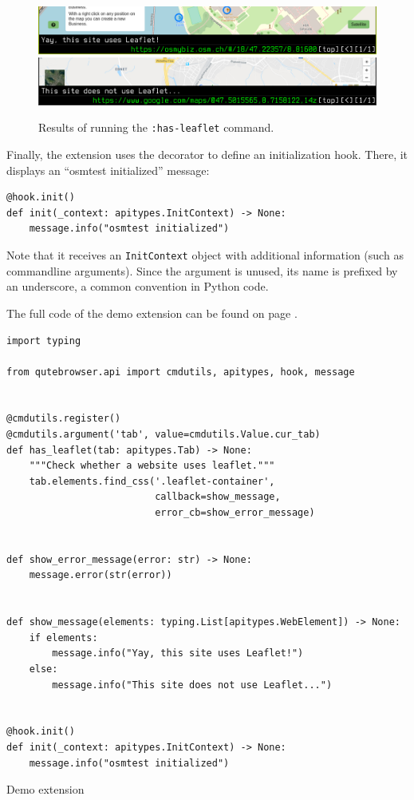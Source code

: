 \begin{figure}[H]
  \centering
  \includegraphics[width=\linewidth]{img/screenshot-leaflet.png} \\[2em]
  \includegraphics[width=\linewidth]{img/screenshot-leaflet-no.png}
  \caption{Results of running the \texttt{:has-leaflet} command.}
\end{figure}

Finally, the extension uses the  decorator to define an
initialization hook. There, it displays an ``osmtest initialized'' message:

\begin{verbatim}
@hook.init()
def init(_context: apitypes.InitContext) -> None:
    message.info("osmtest initialized")
\end{verbatim}

Note that it receives an \verb|InitContext| object with additional information
(such as commandline arguments). Since the argument is unused, its name is
prefixed by an underscore, a common convention in Python code.

The full code of the demo extension can be found on page \pageref{lst:demo}.

\begin{listing}[b]
\centering
\begin{verbatim}
import typing

from qutebrowser.api import cmdutils, apitypes, hook, message


@cmdutils.register()
@cmdutils.argument('tab', value=cmdutils.Value.cur_tab)
def has_leaflet(tab: apitypes.Tab) -> None:
    """Check whether a website uses leaflet."""
    tab.elements.find_css('.leaflet-container',
                          callback=show_message,
                          error_cb=show_error_message)


def show_error_message(error: str) -> None:
    message.error(str(error))


def show_message(elements: typing.List[apitypes.WebElement]) -> None:
    if elements:
        message.info("Yay, this site uses Leaflet!")
    else:
        message.info("This site does not use Leaflet...")


@hook.init()
def init(_context: apitypes.InitContext) -> None:
    message.info("osmtest initialized")
\end{verbatim}
\caption{Demo extension}
\label{lst:demo}
\end{listing}

